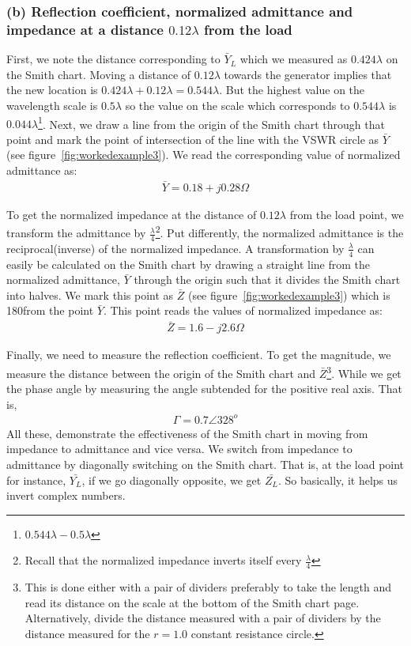 \begin{exmp}
\subsubsection*{(b) Reflection coefficient, normalized admittance and impedance at a distance $0.12\lambda$ from the load}
First, we note the distance corresponding to $\bar{Y}_L$ which we measured as $0.424\lambda$ on the Smith chart. Moving a distance of $0.12\lambda$ towards the generator implies that the new location is $0.424\lambda + 0.12\lambda = 0.544\lambda$. But the highest value on the wavelength scale is $0.5\lambda$ so the value on the scale which corresponds to $0.544\lambda$ is $0.044\lambda$\footnote{
$0.544\lambda-0.5\lambda$
}. Next, we draw a line from the origin of the Smith chart through that point and mark the point of intersection of the line with the VSWR circle as $\bar{Y}$ (see figure~\ref{fig:workedexample3}). We read the corresponding value of normalized admittance as:
\begin{align*}
\bar{Y} = 0.18 + j0.28\Omega
\end{align*}

To get the normalized impedance at the distance of $0.12\lambda$ from the load point, we transform the admittance by $\frac{\lambda}{4}$\footnote{
Recall that the normalized impedance inverts itself every $\frac{\lambda}{4}$
}. Put differently, the normalized admittance is the reciprocal(inverse) of the normalized impedance. A transformation by $\frac{\lambda}{4}$ can easily be calculated on the Smith chart by drawing a straight line from the normalized admittance, $\bar{Y}$ through the origin such that it divides the Smith chart into halves. We mark this point as $\bar{Z}$ (see figure~\ref{fig:workedexample3}) which is 180\textdegree from the point $\bar{Y}$. This point reads the values of normalized impedance as:
\begin{align*}
\bar{Z} = 1.6 - j2.6\Omega
\end{align*}

Finally, we need to measure the reflection coefficient. To get the magnitude, we measure the distance between the origin of the Smith chart and $\bar{Z}$\footnote{
This is done either with a pair of dividers preferably to take the length and read its distance on the scale at the bottom of the Smith chart page. Alternatively, divide the distance measured with a pair of dividers by the distance measured for the $r = 1.0$ constant resistance circle.
}. While we get the phase angle by measuring the angle subtended for the positive real axis. That is,
\begin{align*}
\Gamma = 0.7\angle328^o
\end{align*}
All these, demonstrate the effectiveness of the Smith chart in moving from impedance to admittance and vice versa. We switch from impedance to admittance by diagonally switching on the Smith chart. That is, at the load point for instance, $\bar{Y_{L}}$, if we go diagonally opposite, we get $\bar{Z_{L}}$. So basically, it helps us invert complex numbers. 
\end{exmp}

